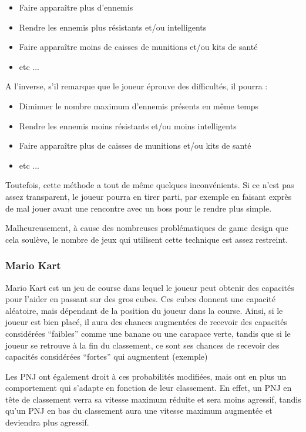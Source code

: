 \documentclass[a4paper, 12pt]{article} %
\begin{document}
\begin{itemize}
	\item Faire apparaître plus d’ennemis
	\item Rendre les ennemis plus résistants et/ou intelligents
	\item Faire apparaître moins de caisses de munitions et/ou kits de santé
	\item etc ...
\end{itemize}

A l’inverse, s’il remarque que le joueur éprouve des difficultés, il pourra :

\begin{itemize}
	\item Diminuer le nombre maximum d’ennemis présents en même temps
	\item Rendre les ennemis moins résistants et/ou moins intelligents
	\item Faire apparaître plus de caisses de munitions et/ou kits de santé
	\item etc ...
\end{itemize}

Toutefois, cette méthode a tout de même quelques inconvénients. Si ce n’est pas assez transparent, le joueur pourra en tirer parti, par exemple en faisant exprès de mal jouer avant une rencontre avec un boss pour le rendre plus simple. 

Malheureusement, à cause des nombreuses problématiques de game design que cela soulève, le nombre de jeux qui utilisent cette technique est assez restreint.

\newpage
\subsubsection{Mario Kart}

Mario Kart est un jeu de course dans lequel le joueur peut obtenir des capacités pour l’aider en passant sur des gros cubes. Ces cubes donnent une capacité aléatoire, mais dépendant de la position du joueur dans la course. Ainsi, si le joueur est bien placé, il aura des chances augmentées de recevoir des capacités considérées “faibles” comme une banane ou une carapace verte, tandis que si le joueur se retrouve à la fin du classement, ce sont ses chances de recevoir des capacités considérées “fortes” qui augmentent (exemple)

Les PNJ ont également droit à ces probabilités modifiées, mais ont en plus un comportement qui s’adapte en fonction de leur classement. En effet, un PNJ en tête de classement verra sa vitesse maximum  réduite et sera moins agressif, tandis qu’un PNJ en bas du classement aura une vitesse maximum augmentée et deviendra plus agressif.
\end{document}
